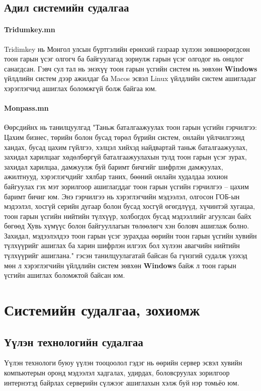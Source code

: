 \section{Адил системийн судалгаа}
\subsubsection{Tridumkey.mn}
Tridimkey нь Монгол улсын бүртгэлийн ерөнхий газраар хүлээн зөвшөөрөгдсөн тоон гарын үсэг олгогч ба байгуулагад зориулж гарын үсэг олгодог нь онцлог санагдсан.
Гэвч сул тал нь энэхүү тоон гарын үсгийн систем нь зөвхөн \textbf{Windows} үйлдлийн систем дээр ажилдаг ба Macos эсвэл Linux үйлдлийн систем ашигладаг хэрэглэгчид ашиглах боломжгүй болж байгаа юм.
\subsubsection{Monpass.mn}
Өөрсдийнх нь танилцуулгад "Таньж баталгаажуулах тоон гарын үсгийн гэрчилгээ: Цахим бизнес, төрийн болон бусад төрөл бүрийн систем, онлайн үйлчилгээнд хандах, бусад цахим гүйлгээ, хэлцэл хийхэд найдвартай таньж баталгаажуулах, захидал харилцааг хөдөлбөргүй баталгаажуулахын тулд тоон гарын үсэг зурах, захидал харилцаа, дамжуулж буй баримт бичгийг шифрлэн дамжуулах, ажилтнууд, хэрэглэгчдийг хялбар таних, бөөний онлайн худалдаа зохион байгуулах гэх мэт зорилгоор ашиглагддаг тоон гарын үсгийн гэрчилгээ – цахим баримт бичиг юм. Энэ гэрчилгээ нь хэрэглэгчийн мэдээлэл, олгосон ГОБ-ын мэдээлэл, хосгүй серийн дугаар болон бусад хосгүй өгөгдлүүд, хүчинтэй хугацаа, тоон гарын үсгийн нийтийн түлхүүр, холбогдох бусад мэдээллийг агуулсан байх бөгөөд Хувь хүмүүс болон байгууллагын төлөөлөгч хэн боловч ашиглаж болно. Захидал, мэдээлэлдээ тоон гарын үсэг зурахдаа өөрийн тоон гарын үсгийн хувийн түлхүүрийг ашиглах ба харин шифрлэн илгээх бол хүлээн авагчийн нийтийн түлхүүрийг ашиглана." гэсэн танилцуулагатай байсан ба гүнзгий судалж үзэхэд мөн л хэрэглэгчийн үйлдлийн систем зөвхөн \textbf{Windows} байж л тоон гарын үсгийн ашиглах боломжтой байсан юм.
\chapter{Системийн судалгаа, зохиомж}
\section{Үүлэн технологийн судалгаа}
Үүлэн технологи буюу үүлэн тооцоолол гэдэг нь өөрийн сервер эсвэл хувийн компьютерын оронд мэдээлэл хадгалах, удирдах, боловсруулах зорилгоор интернэтэд байрлах серверийн сүлжээг ашиглахын хэлж буй нэр томьёо юм.

